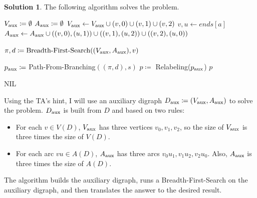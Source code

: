 \documentclass[11pt,leqno,final]{amsart}
\theoremstyle{definition}
\newtheorem{solution}{Solution}
\begin{document}
\begin{solution}
  
  The following algorithm solves the problem.

  \begin{algorithm}
    \caption{MinimizeWalk($D$, $r$, $s$)}\label{1mod3}
    \begin{algorithmic}
      \State $V_{\textnormal{aux}} \coloneqq \emptyset$ 
      \State $A_{\textnormal{aux}} \coloneqq \emptyset$
        \State $V_{\textnormal{aux}} \gets V_{\textnormal{aux}} \cup (v,0) \cup (v,1) \cup (v,2)$ 
      \EndFor
        \State $v,u \gets ends[a]$
        \State $A_{\textnormal{aux}} \gets A_{\textnormal{aux}} \cup ((v,0),(u,1)) \cup ((v,1),(u,2)) \cup ((v,2),(u,0))$
      \EndFor

      \State $\pi, d \coloneqq \textnormal{Breadth-First-Search}((V_{\textnormal{aux}}, A_{\textnormal{aux}}),v)$
      
        \State $p_{\textnormal{aux}} \coloneqq$ Path-From-Branching$((\pi,d),s)$
        \State $p \coloneqq $ Relabeling($p_{\textnormal{aux}}$) 
        \State \Return $p$
      \EndIf

      \State \Return NIL
        
    \end{algorithmic}
  \end{algorithm}

  Using the TA's hint, I will use an auxiliary digraph  $D_{\textnormal{aux}} \coloneqq (V_{\textnormal{aux}}, A_{\textnormal{aux}})$ to solve the problem. $D_{\textnormal{aux}}$ is built from $D$ and based on two rules:
  \begin{itemize}
    \item For each $v \in V(D)$, $V_{\textnormal{aux}}$ has three vertices $v_0, v_1, v_2$, so the size of $V_{\textnormal{aux}}$ is three times the size of $V(D)$. 
    \item For each arc $vu \in A(D)$, $A_{\textnormal{aux}}$ has three arcs ${v_0u_1, v_1u_2, v_2u_0}$. Also, $A_{\textnormal{aux}}$ is three times the size of $A(D)$.
  \end{itemize}

  The algorithm builds the auxiliary digraph, runs a Breadth-First-Search on the auxiliary digraph, and then translates the answer to the desired result.


\end{solution}
\end{document}

